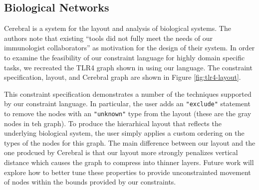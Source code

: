 \subsection{Biological Networks}
Cerebral \cite{barsky2007cerebral} is a system for the layout and analysis of biological systems. The authors note that existing ``tools did not fully meet the needs of our immunologist collaborators'' as motivation for the design of their system. In order to examine the feasibility of our constraint language for highly domain specific tasks, we recreated the TLR4 graph shown in \cite{barsky2007cerebral} using our language. The constraint specification, layout, and Cerebral graph are shown in Figure \ref{fig:tlr4-layout}.

This constraint specification demonstrates a number of the techniques supported by our constraint language. In particular, the user adds an \texttt{"exclude"} statement to remove the nodes with an \texttt{"unknown"} type from the layout (these are the gray nodes in teh graph). To produce the hierarhical layout that reflects the underlying biological system, the user simply applies a custom ordering on the types of the nodes for this graph. The main difference between our layout and the one prodcued by Cerebral is that our layout more strongly penalizes vertical distance which causes the graph to compress into thinner layers. Future work will explore how to better tune these properties to provide unconstrainted movement of nodes within the bounds provided by our constraints.
